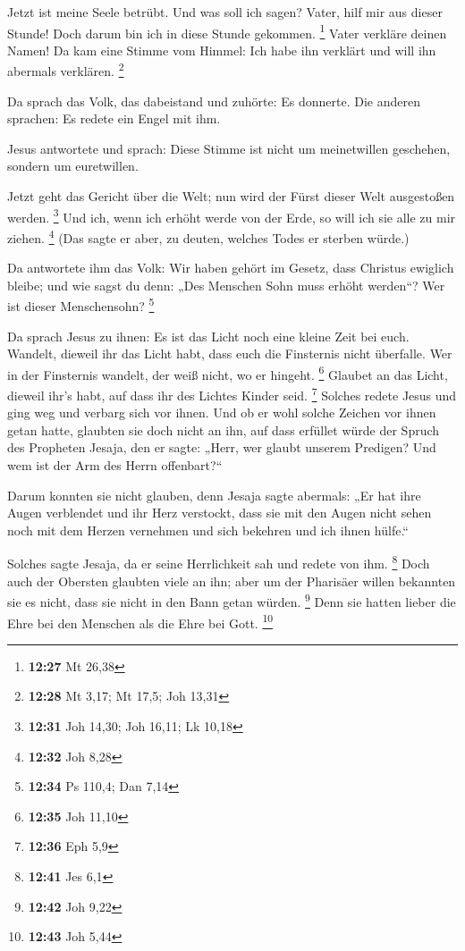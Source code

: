  Jetzt ist meine Seele betrübt. Und was soll ich sagen?
Vater, hilf mir aus dieser Stunde! Doch darum bin ich in diese Stunde
gekommen. \footnote{\textbf{12:27} Mt 26,38}  Vater
verkläre deinen Namen! Da kam eine Stimme vom Himmel: Ich habe ihn
verklärt und will ihn abermals verklären. \footnote{\textbf{12:28} Mt
  3,17; Mt 17,5; Joh 13,31}

 Da sprach das Volk, das dabeistand und zuhörte: Es
donnerte. Die anderen sprachen: Es redete ein Engel mit ihm.

 Jesus antwortete und sprach: Diese Stimme ist nicht um
meinetwillen geschehen, sondern um euretwillen.

 Jetzt geht das Gericht über die Welt; nun wird der Fürst
dieser Welt ausgestoßen werden. \footnote{\textbf{12:31} Joh 14,30; Joh
  16,11; Lk 10,18}  Und ich, wenn ich erhöht werde von der
Erde, so will ich sie alle zu mir ziehen. \footnote{\textbf{12:32} Joh
  8,28}  (Das sagte er aber, zu deuten, welches Todes er
sterben würde.)

 Da antwortete ihm das Volk: Wir haben gehört im Gesetz,
dass Christus ewiglich bleibe; und wie sagst du denn: „Des Menschen Sohn
muss erhöht werden``? Wer ist dieser Menschensohn? \footnote{\textbf{12:34}
  Ps 110,4; Dan 7,14}

 Da sprach Jesus zu ihnen: Es ist das Licht noch eine
kleine Zeit bei euch. Wandelt, dieweil ihr das Licht habt, dass euch die
Finsternis nicht überfalle. Wer in der Finsternis wandelt, der weiß
nicht, wo er hingeht. \footnote{\textbf{12:35} Joh 11,10} 
Glaubet an das Licht, dieweil ihr's habt, auf dass ihr des Lichtes
Kinder seid. \footnote{\textbf{12:36} Eph 5,9}  Solches
redete Jesus und ging weg und verbarg sich vor ihnen. Und ob er wohl
solche Zeichen vor ihnen getan hatte, glaubten sie doch nicht an ihn,
 auf dass erfüllet würde der Spruch des Propheten Jesaja,
den er sagte: „Herr, wer glaubt unserem Predigen? Und wem ist der Arm
des Herrn offenbart?{}``

 Darum konnten sie nicht glauben, denn Jesaja sagte
abermals:  „Er hat ihre Augen verblendet und ihr Herz
verstockt, dass sie mit den Augen nicht sehen noch mit dem Herzen
vernehmen und sich bekehren und ich ihnen hülfe.``

 Solches sagte Jesaja, da er seine Herrlichkeit sah und
redete von ihm. \footnote{\textbf{12:41} Jes 6,1}  Doch
auch der Obersten glaubten viele an ihn; aber um der Pharisäer willen
bekannten sie es nicht, dass sie nicht in den Bann getan würden.
\footnote{\textbf{12:42} Joh 9,22}  Denn sie hatten lieber
die Ehre bei den Menschen als die Ehre bei Gott. \footnote{\textbf{12:43}
  Joh 5,44}

